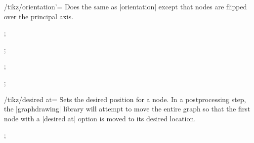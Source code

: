 \begin{key}{/tikz/orientation'=}
  Does the same as |orientation| except that nodes are flipped over the
  principal axis.
  \begin{codeexample}[]
\tikz {};
  \end{codeexample}
  \begin{codeexample}[]
\tikz {};
  \end{codeexample}
  \begin{codeexample}[]
\tikz {};
  \end{codeexample}
  \begin{codeexample}[]
\tikz {};
  \end{codeexample}
\end{key}

\begin{key}{/tikz/desired at=}
  Sets the desired position for a node. In a postprocessing step, the
  |graphdrawing| library will attempt to move the entire graph so that
  the first node with a |desired at| option is moved to its desired 
  location.
  \begin{codeexample}[]
\tikz {};
  \end{codeexample}
\end{key}

